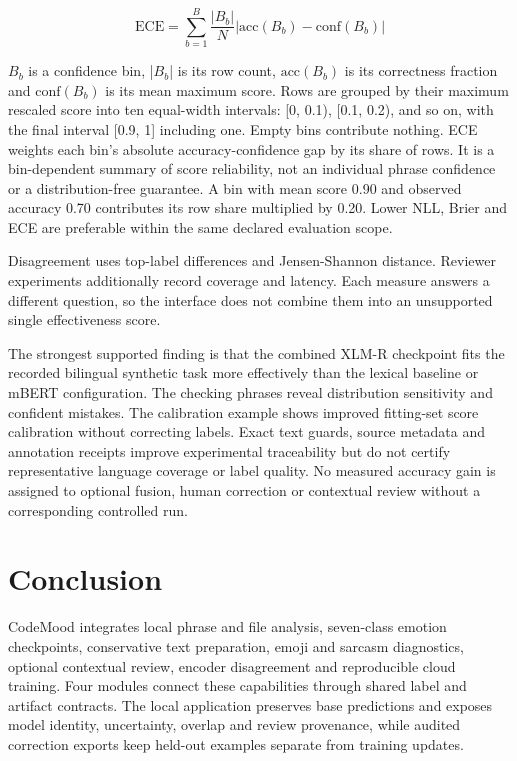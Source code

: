 \documentclass[conference]{IEEEtran}
\begin{document}
\begin{equation}
\mathrm{ECE}=\sum_{b=1}^{B}\frac{|B_b|}{N}\left|\mathrm{acc}(B_b)-\mathrm{conf}(B_b)\right|
\label{eq:ece}
\end{equation}

\(B_b\) is a confidence bin, |\(B_b\)| is its row count, \(\mathrm{acc}(B_b)\) is its correctness fraction and \(\mathrm{conf}(B_b)\) is its mean maximum score. Rows are grouped by their maximum rescaled score into ten equal-width intervals: [0, 0.1), [0.1, 0.2), and so on, with the final interval [0.9, 1] including one. Empty bins contribute nothing. ECE weights each bin's absolute accuracy-confidence gap by its share of rows. It is a bin-dependent summary of score reliability, not an individual phrase confidence or a distribution-free guarantee. A bin with mean score 0.90 and observed accuracy 0.70 contributes its row share multiplied by 0.20. Lower NLL, Brier and ECE are preferable within the same declared evaluation scope.

Disagreement uses top-label differences and Jensen-Shannon distance. Reviewer experiments additionally record coverage and latency. Each measure answers a different question, so the interface does not combine them into an unsupported single effectiveness score.

The strongest supported finding is that the combined XLM-R checkpoint fits the recorded bilingual synthetic task more effectively than the lexical baseline or mBERT configuration. The checking phrases reveal distribution sensitivity and confident mistakes. The calibration example shows improved fitting-set score calibration without correcting labels. Exact text guards, source metadata and annotation receipts improve experimental traceability but do not certify representative language coverage or label quality. No measured accuracy gain is assigned to optional fusion, human correction or contextual review without a corresponding controlled run.

\FloatBarrier
\section{Conclusion}

CodeMood integrates local phrase and file analysis, seven-class emotion checkpoints, conservative text preparation, emoji and sarcasm diagnostics, optional contextual review, encoder disagreement and reproducible cloud training. Four modules connect these capabilities through shared label and artifact contracts. The local application preserves base predictions and exposes model identity, uncertainty, overlap and review provenance, while audited correction exports keep held-out examples separate from training updates.
\end{document}
